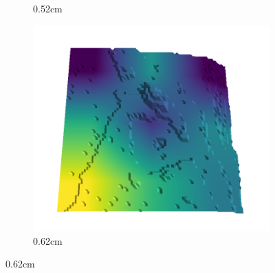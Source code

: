 \documentclass[../document.tex]{subfiles}
\begin{document}
\begin{figure}[H]
\begin{subfigure}[b]{0.192\linewidth}
    \caption{0.52cm}
    \label{fig : quarry-false_positive-19}
    \end{subfigure}
    \begin{subfigure}[b]{0.192\linewidth}
    \includegraphics[width=\linewidth]{../img/5/quarry/false_positive/61-patch-3d-majavi-colormap-240.png}
    \caption{0.62cm}
    \label{fig : quarry-false_positive-20}
    \end{subfigure}
    \label{fig : quarry-false_positive}
    \end{figure}
\end{document}
